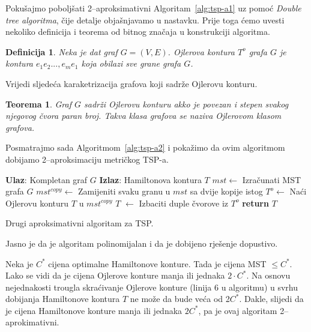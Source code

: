\documentclass[a4paper, utf8, 11pt, colorlinks]{book}
\newtheorem{definition}{Definicija}[chapter]
\newtheorem{thm}{Teorema}[chapter]
\theoremstyle{definition}
\begin{document}
 \noindent Pokušajmo poboljšati 2--aproksimativni Algoritam~\ref{alg:tsp-a1} uz pomoć \emph{Double tree algoritma}, čije detalje objašnjavamo u nastavku. Prije toga ćemo uvesti nekoliko definicija i teorema od bitnog značaja u konstrukciji algoritma. 
 \begin{definition}
 	  Neka je dat graf $G=(V,E)$. Ojlerova kontura $T^o$ grafa $G$ je kontura $e_1e_2...,e_me_1$ koja obilazi sve grane grafa $G$. 
 \end{definition}
Vrijedi sljedeća karaketrizacija grafova koji sadrže Ojlerovu konturu. 
\begin{thm}
	 Graf $G$ sadrži Ojlerovu konturu akko je povezan i stepen svakog njegovog čvora paran broj. Takva klasa grafova se naziva Ojlerovom klasom grafova.
\end{thm}
Posmatrajmo sada  Algoritmom~\ref{alg:tsp-a2} i pokažimo da ovim algoritmom  dobijamo 2--aproksimaciju metričkog TSP-a.
\begin{algorithm}[H] 
	\begin{algorithmic}[1]
		\STATE \textbf{Ulaz}: Kompletan graf $G$
		\STATE \textbf{Izlaz}: Hamiltonova kontura $T$   
		\STATE $mst \gets$  Izračunati MST grafa $G$
		\STATE $mst^{copy} \gets$ Zamijeniti svaku granu u $mst$ sa dvije kopije istog
		\STATE $T^o \gets$ Naći Ojlerovu konturu $T$ u $mst^{copy}$
		\STATE   $T$ $\gets$ Izbaciti duple čvorove iz $T^o$   
		\STATE \textbf{return} $T$ 
	\end{algorithmic}
   	\caption{Drugi aproksimativni algoritam za TSP.}
   	\label{alg:tsp-a2}
\end{algorithm}
   Jasno je da je algoritam polinomijalan i da je dobijeno rješenje dopustivo. 
   
  Neka je $C^*$ cijena optimalne Hamiltonove konture. Tada je cijena MST $\leq C^*$. 
  Lako se vidi da je cijena Ojlerove konture  manja ili jednaka $ 2 \cdot C^*$. Na osnovu nejednakosti trougla skraćivanje Ojlerove konture (linija 6 u algoritmu) u svrhu dobijanja Hamiltonove kontura $T$ ne može da bude veća od 2$C^*$. Dakle, slijedi da je cijena Hamiltonove konture manja ili jednaka $2 C^*$, pa je ovaj algoritam 2--aprokimativni.
  
\end{document}
